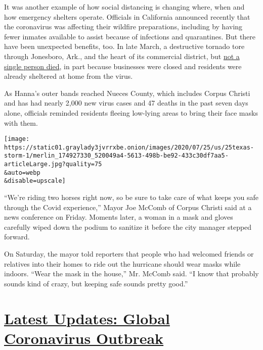 It was another example of how social distancing is changing where, when
and how emergency shelters operate. Officials in California announced
recently that the coronavirus was affecting their wildfire preparations,
including by having fewer inmates available to assist because of
infections and quarantines. But there have been unexpected benefits,
too. In late March, a destructive tornado tore through Jonesboro, Ark.,
and the heart of its commercial district, but
\href{https://www.nytimes3xbfgragh.onion/2020/03/29/us/tornado-coronavirus-arkansas.html}{not
a single person died}, in part because businesses were closed and
residents were already sheltered at home from the virus.

As Hanna's outer bands reached Nueces County, which includes Corpus
Christi and has had nearly 2,000 new virus cases and 47 deaths in the
past seven days alone, officials reminded residents fleeing low-lying
areas to bring their face masks with them.

\texttt{[image: https://static01.graylady3jvrrxbe.onion/images/2020/07/25/us/25texas-storm-1/merlin\_174927330\_520049a4-5613-498b-be92-433c30df7aa5-articleLarge.jpg?quality=75\\\&auto=webp\\\&disable=upscale]}

``We're riding two horses right now, so be sure to take care of what
keeps you safe through the Covid experience,'' Mayor Joe McComb of
Corpus Christi said at a news conference on Friday. Moments later, a
woman in a mask and gloves carefully wiped down the podium to sanitize
it before the city manager stepped forward.

On Saturday, the mayor told reporters that people who had welcomed
friends or relatives into their homes to ride out the hurricane should
wear masks while indoors. ``Wear the mask in the house,'' Mr. McComb
said. ``I know that probably sounds kind of crazy, but keeping safe
sounds pretty good.''

\hypertarget{latest-updates-global-coronavirus-outbreak}{%
\section{\texorpdfstring{\href{https://www.nytimes3xbfgragh.onion/2020/07/24/world/coronavirus-covid-19.html?action=click\&pgtype=Article\&state=default\&module=styln-coronavirus-national\&region=MAIN_CONTENT_1\&context=storylines_live_updates}{Latest
Updates: Global Coronavirus
Outbreak}}{Latest Updates: Global Coronavirus Outbreak}}\label{latest-updates-global-coronavirus-outbreak}}

